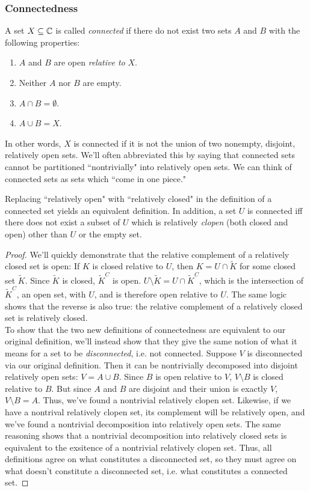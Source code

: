 \subsubsection{Connectedness}
\begin{definition}
A set $X \subseteq \mathbb{C}$ is called \emph{connected} if there do not exist two sets $A$ and $B$ with the following properties:
\begin{enumerate}
\item $A$ and $B$ are open \emph{relative to} $X$.
\item Neither $A$ nor $B$ are empty.
\item $A \cap B = \emptyset$.
\item $A \cup B = X$.
\end{enumerate}
In other words, $X$ is connected if it is not the union of two nonempty, disjoint, relatively open sets. We'll often abbreviated this by saying that connected sets cannot be partitioned ``nontrivially" into relatively open sets. We can think of connected sets as sets which ``come in one piece."
\end{definition}
\begin{lemma}
Replacing ``relatively open" with ``relatively closed" in the definition of a connected set yields an equivalent definition. In addition, a set $U$ is connected iff there does not exist a subset of $U$ which is relatively \emph{clopen} (both closed and open) other than $U$ or the empty set.
\end{lemma}
\begin{proof}
We'll quickly demonstrate that the relative complement of a relatively closed set is open: If $K$ is closed relative to $U$, then $K = U \cap \tilde{K}$ for some closed set $\tilde{K}$. Since $\tilde{K}$ is closed, $\tilde{K}^C$ is open. $U \setminus \tilde{K} = U \cap \tilde{K}^C$, which is the intersection of $\tilde{K}^C$, an open set, with $U$, and is therefore open relative to $U$. The same logic shows that the reverse is also true: the relative complement of a relatively closed set is relatively closed.\\
To show that the two new definitions of connectedness are equivalent to our original definition, we'll instead show that they give the same notion of what it means for a set to be \emph{disconnected}, i.e. not connected. Suppose $V$ is disconnected via our original definition. Then it can be nontrivially decomposed into disjoint relatively open sets: $V = A \cup B$. Since $B$ is open relative to $V$, $V \setminus B$ is closed relative to $B$. But since $A$ and $B$ are disjoint and their union is exactly $V$, $V \setminus B = A$. Thus, we've found a nontrivial relatively clopen set. Likewise, if we have a nontrival relatively clopen set, its complement will be relatively open, and we've found a nontrivial decomposition into relatively open sets. The same reasoning shows that a nontrivial decomposition into relatively closed sets is equivalent to the exsitence of a nontrivial relatively clopen set. Thus, all definitions agree on what constitutes a disconnected set, so they must agree on what doesn't constitute a disconnected set, i.e. what constitutes a connected set.
\end{proof}

